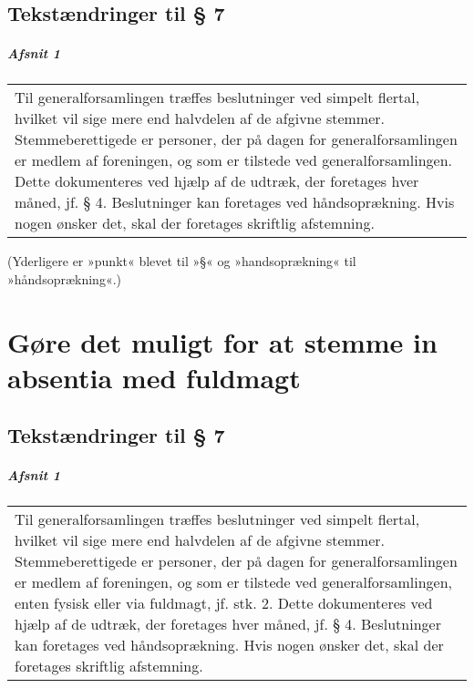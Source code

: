 \documentclass[a4paper,11pt]{report}
\newenvironment{quotationb}%
{\begin{tabular}{|p{10cm}}}%
{\\\end{tabular}}
\begin{document}
\begin{appendices}
\section*{Tekstændringer til § 7}

\paragraph{Afsnit 1}

\begin{quotationb}
Til generalforsamlingen træffes beslutninger ved simpelt flertal, hvilket
vil sige mere end halvdelen af de afgivne stemmer. Stemmeberettigede
er personer, der på dagen for generalforsamlingen er medlem af 
foreningen, og som er tilstede ved generalforsamlingen. Dette 
dokumenteres ved hjælp af de udtræk, der foretages hver måned, 
jf. § 4. Beslutninger kan foretages ved håndsoprækning. Hvis
nogen ønsker det, skal der foretages skriftlig afstemning.
\end{quotationb}

\setlength{\parskip}{15pt}
(Yderligere er »punkt« blevet til »§« og »handsoprækning« til
»håndsoprækning«.)
\setlength{\parskip}{0pt}

\chapter{Gøre det muligt for at stemme in absentia med fuldmagt}
\label{app:b5}

\section*{Tekstændringer til § 7}

\paragraph{Afsnit 1}

\begin{quotationb}
Til generalforsamlingen træffes beslutninger ved simpelt flertal, hvilket
vil sige mere end halvdelen af de afgivne stemmer. Stemmeberettigede
er personer, der på dagen for generalforsamlingen er medlem af 
foreningen, og som er tilstede ved generalforsamlingen, enten fysisk eller
via fuldmagt, jf. stk. 2. Dette dokumenteres ved hjælp af de udtræk, der
foretages hver måned, jf. § 4. Beslutninger kan foretages ved håndsoprækning.
Hvis nogen ønsker det, skal der foretages skriftlig afstemning.
\end{quotationb}


\end{appendices}
\end{document}
